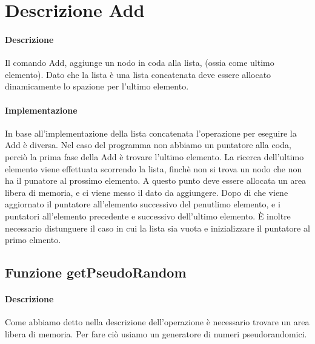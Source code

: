\section{Descrizione Add}
\paragraph{Descrizione}
Il comando Add, aggiunge un nodo in coda alla lista, (ossia come ultimo elemento). 
Dato che la lista è una lista concatenata deve essere allocato dinamicamente lo spazione per l'ultimo elemento.

\paragraph{Implementazione}
In base all'implementazione della lista concatenata l'operazione per eseguire la Add è diversa.
Nel caso del programma non abbiamo un puntatore alla coda, perciò la prima fase della Add è trovare l'ultimo elemento.
La ricerca dell'ultimo elemento viene effettuata scorrendo la lista, finchè non si trova un nodo che non ha il punatore al prossimo elemento.
A questo punto deve essere allocata un area libera di memoria, e ci viene messo il dato da aggiungere.
Dopo di che viene aggiornato il puntatore all'elemento successivo del penutlimo elemento, 
e i puntatori all'elemento precedente e successivo dell'ultimo elemento.
È inoltre necessario distunguere il caso in cui la lista sia vuota e inizializzare il puntatore al primo elmento.

\subsection{Funzione getPseudoRandom}
\paragraph{Descrizione}
Come abbiamo detto nella descrizione dell'operazione è necessario trovare un area libera di memoria.
Per fare ciò usiamo un generatore di numeri pseudorandomici. 
